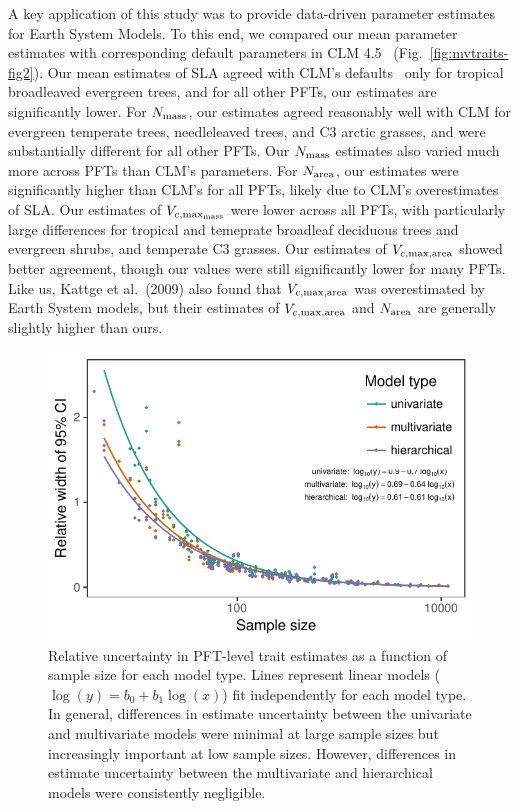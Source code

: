 A key application of this study was to provide data-driven parameter estimates for Earth System Models.
To this end, we compared our mean parameter estimates with corresponding default parameters in CLM 4.5~\cite{clm45_note} (Fig.~\ref{fig:mvtraits-fig2}).
Our mean estimates of SLA agreed with CLM's defaults~\cite[Table 8.1 in]{clm45_note} only for tropical broadleaved evergreen trees, and for all other PFTs, our estimates are significantly lower.
For $N_{\text{mass}}$, our estimates agreed reasonably well with CLM for evergreen temperate trees, needleleaved trees, and C3 arctic grasses, and were substantially different for all other PFTs.
Our $N_{\text{mass}}$ estimates also varied much more across PFTs than CLM's parameters.
For $N_{\text{area}}$, our estimates were significantly higher than CLM's for all PFTs, likely due to CLM's overestimates of SLA\@.
Our estimates of $V_{c,\max_{\text{mass}}}$ were lower across all PFTs, with particularly large differences for tropical and temeprate broadleaf deciduous trees and evergreen shrubs, and temperate C3 grasses.
Our estimates of $V_{c,\max,\text{area}}$ showed better agreement, though our values were still significantly lower for many PFTs.
Like us, Kattge et al.~(2009) \nocite{kattge_2009_vcmax} also found that $V_{c,\max,\text{area}}$ was overestimated by Earth System models,
but their estimates of $V_{c,\max,\text{area}}$ and $N_{\text{area}}$ are generally slightly higher than ours.

\begin{figure}
  \centering
  \includegraphics[width=\textwidth]{1_mvtraits/figures/relative_ci_model.pdf}
  \caption{%
    Relative uncertainty in PFT-level trait estimates as a function of sample size for each model type.
    Lines represent linear models ($\log(y) = b_0 + b_1 \log(x)$) fit independently for each model type.
    In general, differences in estimate uncertainty between the univariate and multivariate models were minimal at large sample sizes but increasingly important at low sample sizes.
    However, differences in estimate uncertainty between the multivariate and hierarchical models were consistently negligible.
  }\label{fig:mvtraits-fig3}
\end{figure}

